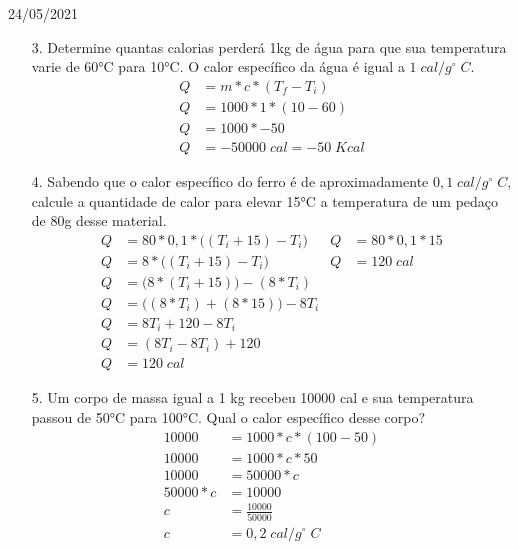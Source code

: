 \documentclass{SchoolBook}
\begin{document}
    \begin{day}{24/05/2021}
        \begin{enumerate}
            \item[3.] Determine quantas calorias perderá 1kg de água para que sua temperatura varie de 60°C para 10°C. O calor específico da água é igual a $ 1\;cal/g^\circ\;C $.
            \begin{align*}
                Q &= m * c * (T_f - T_i)    \\
                Q &= 1000 * 1 * (10 - 60)   \\
                Q &= 1000 * -50             \\
                Q &= -50000\;cal = -50\;Kcal
            \end{align*}
            
            \item[4.] Sabendo que o calor específico do ferro é de aproximadamente $ 0,1\;cal/g^\circ\;C $, calcule a quantidade de calor para elevar 15°C a temperatura de um pedaço de 80g desse material.
            \begin{align*}
                Q &= 80 * 0,1 * \Big((T_i + 15) - T_i\Big)  & Q &= 80 * 0,1 * 15 \\
                Q &= 8 * \Big((T_i + 15) - T_i\Big)         & Q &= 120\;cal      \\
                Q &= \Big(8 * (T_i + 15)\Big) - (8 * T_i)   \\
                Q &= \Big((8 * T_i) + (8 * 15)\Big) - 8 T_i \\
                Q &= 8T_i + 120 - 8T_i                      \\
                Q &= (8T_i - 8T_i) + 120                    \\
                Q &= 120\;cal
            \end{align*}
            
            \item[5.] Um corpo de massa igual a 1 kg recebeu 10000 cal e sua temperatura passou de 50°C para 100°C. Qual o calor específico desse corpo?
            \begin{align*}
                     10000 &= 1000 * c * (100 - 50) \\
                     10000 &= 1000 * c * 50         \\
                     10000 &= 50000 * c             \\
                 50000 * c &= 10000                 \\
                         c &= \frac{10000}{50000}   \\
                         c &= 0,2\;cal/g^\circ\;C
            \end{align*}
        \end{enumerate}
    \end{day}
    
\end{document}
